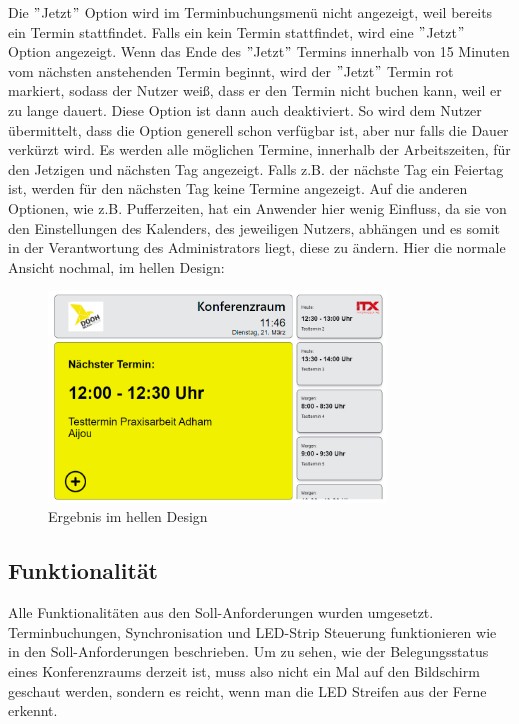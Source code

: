 Die \("\)Jetzt\("\) Option wird im Terminbuchungsmenü nicht angezeigt, weil bereits ein Termin stattfindet.
Falls ein kein Termin stattfindet, wird eine \("\)Jetzt\("\) Option angezeigt.
Wenn das Ende des \("\)Jetzt\("\) Termins innerhalb von 15 Minuten vom nächsten anstehenden Termin beginnt, wird der \("\)Jetzt\("\) Termin rot markiert, sodass der Nutzer weiß, dass er den Termin nicht buchen kann, weil er zu lange dauert.
Diese Option ist dann auch deaktiviert.
So wird dem Nutzer übermittelt, dass die Option generell schon verfügbar ist, aber nur falls die Dauer verkürzt wird.
Es werden alle möglichen Termine, innerhalb der Arbeitszeiten, für den Jetzigen und nächsten Tag angezeigt.
Falls z.B. der nächste Tag ein Feiertag ist, werden für den nächsten Tag keine Termine angezeigt.
Auf die anderen Optionen, wie z.B. Pufferzeiten, hat ein Anwender hier wenig Einfluss, da sie von den Einstellungen des Kalenders, des jeweiligen Nutzers, abhängen und es somit in der Verantwortung des Administrators liegt, diese zu ändern.
\newline
\newline
Hier die normale Ansicht nochmal, im hellen Design:
\par\vspace{1cm}
\begin{figure}[h]
    \centering
    \includegraphics[width=0.8\textwidth]{Bilder/Ergebnis_lightMode}
    \caption{Ergebnis im hellen Design}
    \label{fig:Ergebnis im hellen Design}
\par\vspace{1cm}
\end{figure}
\justifying
\newline
\newline
\pagebreak
\subsection{Funktionalität}\label{subsec:funktionalitaet}
Alle Funktionalitäten aus den Soll-Anforderungen wurden umgesetzt.
\newline
Terminbuchungen, Synchronisation und LED-Strip Steuerung funktionieren wie in den Soll-Anforderungen beschrieben.
Um zu sehen, wie der Belegungsstatus eines Konferenzraums derzeit ist, muss also nicht ein Mal auf den Bildschirm geschaut werden, sondern es reicht, wenn man die LED Streifen aus der Ferne erkennt.
\newline
\newline
